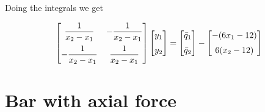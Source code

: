 \documentclass[letterpaper,10pt]{article}
\begin{document}
Doing the integrals we get

\begin{equation}
\begin{bmatrix}
\displaystyle
\frac{1}{x_2-x_1} &
\displaystyle
-\frac{1}{x_2-x_1}\vspace{2mm} \\
\displaystyle
-\frac{1}{x_2-x_1} &
\displaystyle
\frac{1}{x_2-x_1}
\end{bmatrix}
\begin{bmatrix}
y_1 \vspace{2mm}\\
y_2
\end{bmatrix}
=
\begin{bmatrix}
\displaystyle
\bar{q}_1 \vspace{2mm}\\
\displaystyle
\bar{q}_2
\end{bmatrix}
-
\begin{bmatrix}
\displaystyle
-(6x_1-12) \vspace{2mm}\\
\displaystyle
6(x_2 - 12)
\end{bmatrix}
\end{equation}

\section{Bar with axial force}
\end{document}
